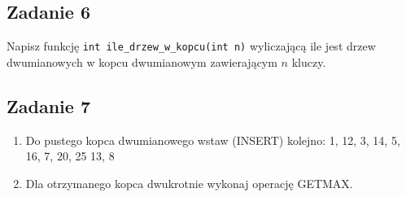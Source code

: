 \documentclass{article}
\begin{document}
\subsection*{Zadanie 6}
Napisz funkcję \verb`int ile_drzew_w_kopcu(int n)` wyliczającą ile jest drzew dwumianowych w kopcu
dwumianowym zawierającym $n$ kluczy.

\subsection*{Zadanie 7}
\begin{enumerate}[label=(\alph*)]
	\item Do pustego kopca dwumianowego wstaw (INSERT) kolejno: 1, 12, 3, 14, 5, 16, 7, 20, 25 13, 8
	\item Dla otrzymanego kopca dwukrotnie wykonaj operację GETMAX.
\end{enumerate}
\end{document}
